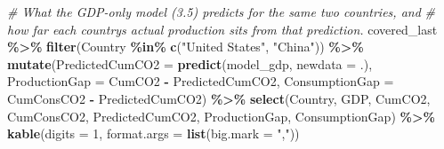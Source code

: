 \documentclass[
]{article}
\newenvironment{Shaded}{\begin{snugshade}}{\end{snugshade}}
\newcommand{\AttributeTok}[1]{\textcolor[rgb]{0.13,0.29,0.53}{#1}}
\newcommand{\CommentTok}[1]{\textcolor[rgb]{0.56,0.35,0.01}{\textit{#1}}}
\newcommand{\DecValTok}[1]{\textcolor[rgb]{0.00,0.00,0.81}{#1}}
\newcommand{\FunctionTok}[1]{\textcolor[rgb]{0.13,0.29,0.53}{\textbf{#1}}}
\newcommand{\NormalTok}[1]{#1}
\newcommand{\SpecialCharTok}[1]{\textcolor[rgb]{0.81,0.36,0.00}{\textbf{#1}}}
\newcommand{\StringTok}[1]{\textcolor[rgb]{0.31,0.60,0.02}{#1}}
\begin{document}
\begin{Shaded}
\begin{Highlighting}[]
\CommentTok{\# What the GDP{-}only model (3.5) predicts for the same two countries, and}
\CommentTok{\# how far each country\textquotesingle{}s actual production sits from that prediction.}
\NormalTok{covered\_last }\SpecialCharTok{\%\textgreater{}\%}
  \FunctionTok{filter}\NormalTok{(Country }\SpecialCharTok{\%in\%} \FunctionTok{c}\NormalTok{(}\StringTok{"United States"}\NormalTok{, }\StringTok{"China"}\NormalTok{)) }\SpecialCharTok{\%\textgreater{}\%}
  \FunctionTok{mutate}\NormalTok{(}\AttributeTok{PredictedCumCO2 =} \FunctionTok{predict}\NormalTok{(model\_gdp, }\AttributeTok{newdata =}\NormalTok{ .),}
         \AttributeTok{ProductionGap =}\NormalTok{ CumCO2 }\SpecialCharTok{{-}}\NormalTok{ PredictedCumCO2,}
         \AttributeTok{ConsumptionGap =}\NormalTok{ CumConsCO2 }\SpecialCharTok{{-}}\NormalTok{ PredictedCumCO2) }\SpecialCharTok{\%\textgreater{}\%}
  \FunctionTok{select}\NormalTok{(Country, GDP, CumCO2, CumConsCO2, PredictedCumCO2,}
\NormalTok{         ProductionGap, ConsumptionGap) }\SpecialCharTok{\%\textgreater{}\%}
  \FunctionTok{kable}\NormalTok{(}\AttributeTok{digits =} \DecValTok{1}\NormalTok{, }\AttributeTok{format.args =} \FunctionTok{list}\NormalTok{(}\AttributeTok{big.mark =} \StringTok{","}\NormalTok{))}
\end{Highlighting}
\end{Shaded}
\end{document}
